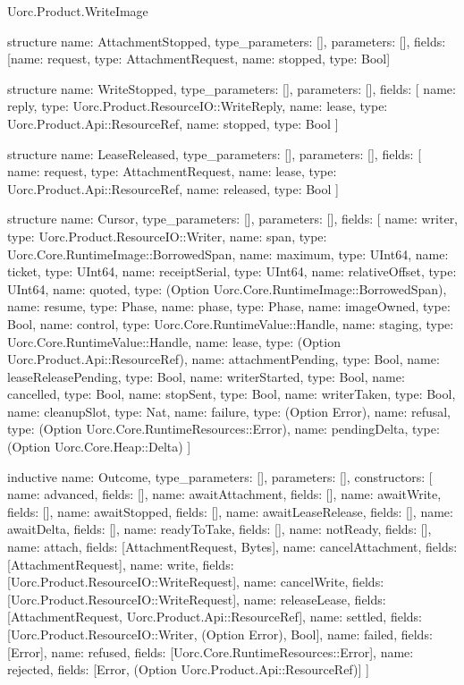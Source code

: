 \begin{lexlean}{Uorc.Product.WriteImage}
\begin{semanticmodule}
structure{
  name: AttachmentStopped,
  type_parameters: [],
  parameters: [],
  fields: [{name: request, type: AttachmentRequest}, {name: stopped, type: Bool}]
}

structure{
  name: WriteStopped,
  type_parameters: [],
  parameters: [],
  fields: [
    {name: reply, type: Uorc.Product.ResourceIO::WriteReply},
    {name: lease, type: Uorc.Product.Api::ResourceRef},
    {name: stopped, type: Bool}
  ]
}

structure{
  name: LeaseReleased,
  type_parameters: [],
  parameters: [],
  fields: [
    {name: request, type: AttachmentRequest},
    {name: lease, type: Uorc.Product.Api::ResourceRef},
    {name: released, type: Bool}
  ]
}

structure{
  name: Cursor,
  type_parameters: [],
  parameters: [],
  fields: [
    {name: writer, type: Uorc.Product.ResourceIO::Writer},
    {name: span, type: Uorc.Core.RuntimeImage::BorrowedSpan},
    {name: maximum, type: UInt64},
    {name: ticket, type: UInt64},
    {name: receiptSerial, type: UInt64},
    {name: relativeOffset, type: UInt64},
    {name: quoted, type: (Option Uorc.Core.RuntimeImage::BorrowedSpan)},
    {name: resume, type: Phase},
    {name: phase, type: Phase},
    {name: imageOwned, type: Bool},
    {name: control, type: Uorc.Core.RuntimeValue::Handle},
    {name: staging, type: Uorc.Core.RuntimeValue::Handle},
    {name: lease, type: (Option Uorc.Product.Api::ResourceRef)},
    {name: attachmentPending, type: Bool},
    {name: leaseReleasePending, type: Bool},
    {name: writerStarted, type: Bool},
    {name: cancelled, type: Bool},
    {name: stopSent, type: Bool},
    {name: writerTaken, type: Bool},
    {name: cleanupSlot, type: Nat},
    {name: failure, type: (Option Error)},
    {name: refusal, type: (Option Uorc.Core.RuntimeResources::Error)},
    {name: pendingDelta, type: (Option Uorc.Core.Heap::Delta)}
  ]
}

inductive{
  name: Outcome,
  type_parameters: [],
  parameters: [],
  constructors: [
    {name: advanced, fields: []},
    {name: awaitAttachment, fields: []},
    {name: awaitWrite, fields: []},
    {name: awaitStopped, fields: []},
    {name: awaitLeaseRelease, fields: []},
    {name: awaitDelta, fields: []},
    {name: readyToTake, fields: []},
    {name: notReady, fields: []},
    {name: attach, fields: [AttachmentRequest, Bytes]},
    {name: cancelAttachment, fields: [AttachmentRequest]},
    {name: write, fields: [Uorc.Product.ResourceIO::WriteRequest]},
    {name: cancelWrite, fields: [Uorc.Product.ResourceIO::WriteRequest]},
    {name: releaseLease, fields: [AttachmentRequest, Uorc.Product.Api::ResourceRef]},
    {name: settled, fields: [Uorc.Product.ResourceIO::Writer, (Option Error), Bool]},
    {name: failed, fields: [Error]},
    {name: refused, fields: [Uorc.Core.RuntimeResources::Error]},
    {name: rejected, fields: [Error, (Option Uorc.Product.Api::ResourceRef)]}
  ]
}


\end{semanticmodule}
\end{lexlean}
